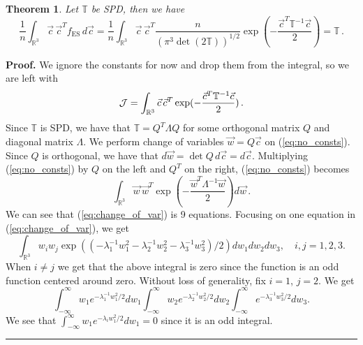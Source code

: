 \documentclass[12pt]{CSUNthesis}
\def\T{\mathbb{T}}
\def\R{\mathbb{R}}
\newtheorem{theorem}{Theorem}
\newenvironment{proof}[1][Proof]{\noindent\textbf{#1.} }{\newline \hspace*{\textwidth}\hspace*{-0,4cm} \rule{0.5em}{0.5em} \vspace{0,2cm}}
\def\T{\mathbb{T}}
\def\R{\mathbb{R}}
\begin{document}
\begin{theorem}
Let $\T$ be SPD, then we have
\begin{equation}
\label{eq:es_ident}
\frac{1}{n} \int_{\R^3} \vec{c}\,\vec{c}^T f_{\text{ES}} \,  d\vec{c} = \frac{1}{n}\int_{\R^3} \vec{c}\,\vec{c}^T \frac{n}{(\pi^3 \det(2\T))^{1/2}} \exp(-\frac{\vec{c}^T \T^{-1} \vec{c}}{2}) = \T \, .
\end{equation}
\end{theorem}
\begin{proof}
We ignore the constants for now and drop them from the integral, so we are left with
\begin{equation}
\label{eq:no_consts}
{\cal J}= \int_{\R^3} \vec{c} \, \vec{c}^T \exp(-\frac{\vec{c}^T \T^{-1} \vec{c}}{2}) \, .
\end{equation}
Since $\T$ is SPD, we have that $\T = Q^T \Lambda Q$ for some orthogonal matrix $Q$ and diagonal matrix $\Lambda$. We perform change of variables $\vec{w} = Q\vec{c}$ on (\ref{eq:no_consts}). Since $Q$ is orthogonal, we have that $d\vec{w} = \det Q\, d \vec{c} =d\vec{c}$. Multiplying (\ref{eq:no_consts}) by $Q$ on the left and $Q^T$ on the right, (\ref{eq:no_consts}) becomes
\begin{equation}
\label{eq:change_of_var}
\int_{\R^3} \vec{w}\,\vec{w}^T \exp(-\frac{\vec{w}^T \Lambda^{-1} \vec{w}}{2}) d\vec{w}\, .
\end{equation}
We can see that (\ref{eq:change_of_var}) is 9 equations. Focusing on one equation in (\ref{eq:change_of_var}), we get
\begin{equation}
\label{eq:entries}
\int_{\R^3} w_i w_j \exp((-\lambda_1^{-1} w_1^2 - \lambda_2^{-1} w_2^2 - \lambda_3^{-1} w_3^2)/2) dw_1 dw_2 dw_3, \quad i,j=1,2,3.
\end{equation}
When $i \not = j$ we get that the above integral is zero since the function is an odd function centered around zero. Without loss of generality, fix $i=1$, $j=2$. We get 
\begin{equation*}
\int_{-\infty}^{\infty} w_1 e^{-\lambda_1^{-1}w_1^2/2} dw_1 \int_{-\infty}^{\infty} w_2 e^{-\lambda_2^{-1}w_2^2/2} dw_2 \int_{-\infty}^{\infty} e^{-\lambda_3^{-1}w_3^2/2} dw_3 .
\end{equation*}
We see that $\int_{-\infty}^{\infty} w_1 e^{-\lambda_iw_1^2/2} dw_1 = 0$ since it is an odd integral. 


\end{proof}
\end{document}
